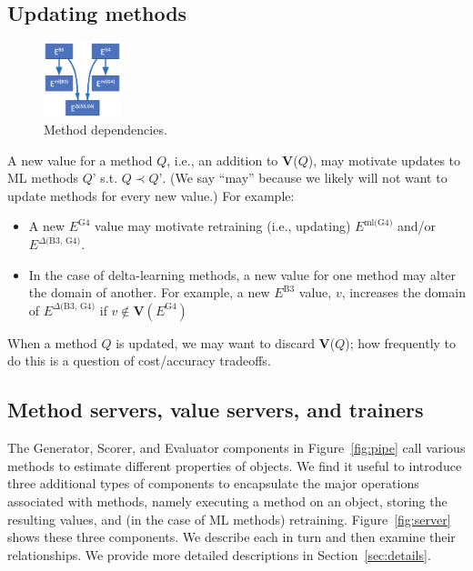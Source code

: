 \documentclass[10pt]{article}
\begin{document}
\subsection{Updating methods}

\begin{figure}
\vspace{-3ex}
  \centering
  \includegraphics[width=0.2\textwidth,trim=0in 0in 0in 0in,clip]{./Figs/deps.png}
  \vspace{-4ex}
  \caption{Method dependencies.
\label{fig:deps}}
\end{figure}

A new value for a method $Q$, i.e., an addition to \textbf{V}($Q$), may motivate updates to ML methods $Q’$ s.t. $Q \prec Q’$. 
(We say ``may'' because we likely will not want to update methods for every new value.)
For example:
\begin{itemize}\itemsep-0.2em 
\item
A new $E^{\textrm{G4}}$ value may motivate retraining (i.e., updating) $E^{\textrm{ml(G4)}}$ and/or $E^{\textrm{$\Delta$(B3, G4)}}$.
\item
In the case of delta-learning methods, a new value for one method may alter the domain of another.
For example, a new $E^{\textrm{B3}}$  value, $v$, increases the domain of $E^{\textrm{$\Delta$(B3, G4)}}$ if $v \notin \textbf{V}(E^{\textrm{G4}})$
\end{itemize}

When a method $Q$ is updated, we may want to discard \textbf{V}($Q$);
how frequently to do this is a question of cost/accuracy tradeoffs.

\subsection{Method servers, value servers, and trainers}

The Generator, Scorer, and Evaluator components in Figure~\ref{fig:pipe} call various methods to estimate different properties of objects.
We find it useful to introduce three additional types of components to encapsulate the major operations associated with methods,
namely executing a method on an object, storing the resulting values, and (in the case of ML methods) retraining.  
Figure~\ref{fig:server} shows these three components. 
We describe each in turn and then examine their relationships.
We provide more detailed descriptions in Section~\ref{sec:details}.
\end{document}

